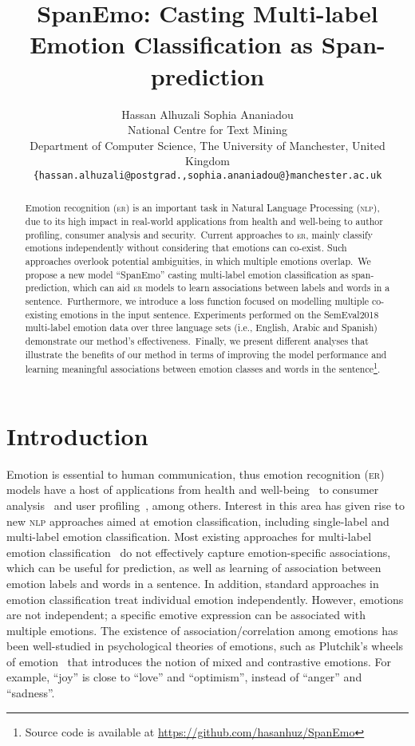 \documentclass[11pt,a4paper]{article}
\title{SpanEmo: Casting Multi-label Emotion Classification as Span-prediction}
\author{Hassan Alhuzali \quad \quad Sophia Ananiadou \\
    National Centre for Text Mining \\
    Department of Computer Science, The University of Manchester, United Kingdom \\
  \texttt{\{hassan.alhuzali@postgrad.,sophia.ananiadou@\}manchester.ac.uk}}
\begin{document}
\raggedbottom




\maketitle
\begin{abstract}
  Emotion recognition (\textsc{er}) is an important task in Natural Language Processing (\textsc{nlp}), due to its high impact in real-world applications from health and well-being to author profiling, consumer analysis and security.~Current approaches to \textsc{er}, mainly classify emotions independently without considering that emotions can co-exist. Such approaches overlook potential ambiguities, in which multiple emotions overlap.~We propose a new model ``SpanEmo'' casting multi-label emotion classification as span-prediction, which can aid \textsc{er} models to learn associations between labels and words in a sentence.~Furthermore, we introduce a loss function focused on modelling multiple co-existing emotions in the input sentence. Experiments performed on the SemEval2018 multi-label emotion data over three language sets (i.e., English, Arabic and Spanish) demonstrate our method's effectiveness.~Finally, we present different analyses that illustrate the benefits of our method in terms of improving the model performance and learning meaningful associations between emotion classes and words in the sentence\footnote{Source code is available at \url{https://github.com/hasanhuz/SpanEmo}}.  \end{abstract}

\section{Introduction}
Emotion is essential to human communication, thus emotion recognition (\textsc{er}) models have a host of applications from health and well-being~\cite{alhuzali-ananiadou-2019-improving,aragon2019detecting,chen2018mood} to consumer analysis~\cite{alaluf2019emotions,herzig2016predicting} and user profiling~\cite{volkova2016inferring,mohammad2013using}, among others. Interest in this area has given rise to new \textsc{nlp} approaches aimed at emotion classification, including single-label and multi-label emotion classification. Most existing approaches for multi-label emotion classification~\cite{ying-etal-2019-improving,baziotis2018ntua,yu2018improving,badaro-etal-2018-ema,mulki-etal-2018-tw,Mohammad2018semeval,yang2018sgm} do not effectively capture emotion-specific associations, which can be useful for prediction, as well as learning of association between emotion labels and words in a sentence. In addition, standard approaches in emotion classification treat individual emotion independently. However, emotions are not independent; a specific emotive expression can be associated with multiple emotions. The existence of association/correlation among emotions has been well-studied in psychological theories of emotions, such as Plutchik's wheels of emotion~\cite{plutchik1984emotions} that introduces the notion of mixed and contrastive emotions. For example, ``joy'' is close to ``love'' and ``optimism'', instead of ``anger'' and ``sadness''. 
\end{document}
